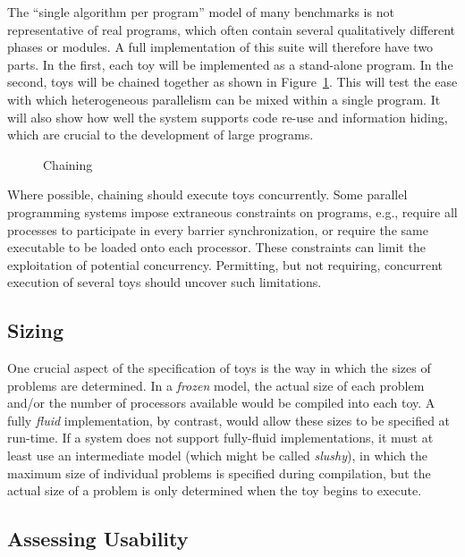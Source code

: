 The ``single algorithm per program'' model of many benchmarks is not representative of real programs,
which often contain several qualitatively different phases or modules.
A full implementation of this suite will therefore have two parts.
In the first,
each toy will be implemented as a stand-alone program.
In the second,
toys will be chained together as shown in Figure~\ref{f:chaining}.
This will test the ease with which heterogeneous parallelism can be mixed within a single program.
It will also show how well the system supports code re-use and information hiding,
which are crucial to the development of large programs.

\begin{figure}
\caption{Chaining\label{f:chaining}}
\end{figure}

Where possible,
chaining should execute toys concurrently.
Some parallel programming systems impose extraneous constraints on programs,
e.g., require all processes to participate in every barrier synchronization,
or require the same executable to be loaded onto each processor.
These constraints can limit the exploitation of potential concurrency.
Permitting, but not requiring, concurrent execution of several toys should uncover such limitations.

\subsection{Sizing\label{s:method-size}}

One crucial aspect of the specification of toys is
the way in which the sizes of problems are determined.
In a \emph{frozen} model,
the actual size of each problem and/or the number of processors available would be compiled into each toy.
A fully \emph{fluid} implementation, by contrast, would allow these sizes to be specified at run-time.
If a system does not support fully-fluid implementations,
it must at least use an intermediate model (which might be called \emph{slushy}),
in which the maximum size of individual problems is specified during compilation,
but the actual size of a problem is only determined when the toy begins to execute.

\subsection{Assessing Usability\label{s:method-assess}}

